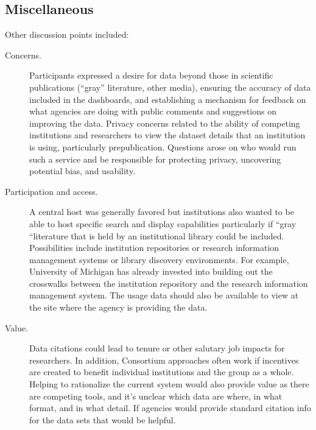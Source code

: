\documentclass[titlepage, 11pt]{article}
\begin{document}
{\begin{itemize}
\end{itemize}

\subsection*{Miscellaneous}
Other discussion points included:
\begin{description}
    \item [Concerns.] Participants expressed a desire for data beyond those in scientific publications (“gray” literature, other media), ensuring the accuracy of data included in the dashboards, and establishing a mechanism for feedback on what agencies are doing with public comments and suggestions on improving the data.  Privacy concerns related to the ability of competing institutions and researchers to view the dataset details that an institution is using, particularly prepublication. Questions arose on who would run such a service and be responsible for protecting privacy, uncovering potential bias, and usability. 
    \item [Participation and access.] A central host was generally favored but institutions also wanted to be able to host specific search and display capabilities particularly if “gray “literature that is held by an institutional library could be included.  Possibilities include institution repositories or research information management systems or library discovery environments. For example, University of Michigan has already invested into building out the crosswalks between the institution repository and the research information management system. The usage data should also be available to view at the site where the agency is providing the data.
    \item [Value.] Data citations could lead to tenure or other salutary job impacts for researchers. In addition, Consortium approaches often work if incentives are created to benefit individual institutions and the group as a whole.  Helping to rationalize the current system would also provide value as there are competing tools, and it's unclear which data are where, in what format, and in what detail. If agencies would provide standard citation info for the data sets that would be helpful. 

\end{description}

\clearpage
\begin{thebibliography}{99}


\end{thebibliography}}
\end{document}
